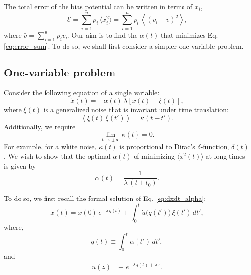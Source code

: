 \documentclass[reprint]{revtex4-1}
\begin{document}
The total error of the bias potential can be written in
terms of $x_i$,
\begin{equation}
\mathcal E
=
\sum_{i = 1}^n p_i \, \langle x_i^2 \rangle
=
\sum_{i = 1}^n p_i \, \left\langle (v_i - \bar v)^2 \right\rangle,
\label{eq:error_sum}
\end{equation}
where
$\bar v = \sum_{i = 1}^n p_i v_i$.
%
Our aim is to find the $\alpha(t)$
that minimizes Eq. \eqref{eq:error_sum}.
%
To do so, we shall first consider
a simpler one-variable problem.



\subsection{One-variable problem}



Consider the following equation
of a single variable:
%
\begin{equation}
\dot x(t) = -\alpha(t) \, \lambda \left[ x(t) - \xi(t) \right],
\label{eq:dxdt_alpha}
\end{equation}
%
where $\xi(t)$ is a generalized noise
that is invariant under time translation:
%
\begin{equation}
\left\langle \xi(t) \, \xi(t') \right\rangle
=
\kappa(t - t').
\label{eq:noise_correlation}
\end{equation}
%
Additionally, we require
\begin{equation}
  \lim_{t \rightarrow \pm\infty} \kappa(t) = 0.
  \label{eq:kappat_limit}
\end{equation}
%
For example, for a white noise,
$\kappa(t)$ is proportional to
Dirac's $\delta$-function, $\delta(t)$.
%
We wish to show that the optimal $\alpha(t)$
of minimizing $\langle x^2(t) \rangle$ at long times
is given by
%
\begin{equation}
  \alpha(t) = \frac{1}{\lambda \, (t + t_0)}.
\label{eq:alpha_opt}
\end{equation}



To do so, we first recall
the formal solution of Eq. \eqref{eq:dxdt_alpha}:
%
\begin{equation}
x(t) = x(0) \, e^{-\lambda \, q(t)}
+ \int_0^t \dot u\bigl( q(t') \bigr) \, \xi(t') \, dt',
\label{eq:xt_solution}
\end{equation}
%
where,
%
\begin{equation}
q(t) \equiv \int_0^t \alpha(t') \, dt',
\label{eq:qt_definition}
\end{equation}
%
and
%
\begin{align}
u(z)
&\equiv
e^{-\lambda \, q(t) + \lambda \, z}.
\label{eq:ut_definition}
\end{align}
\end{document}
